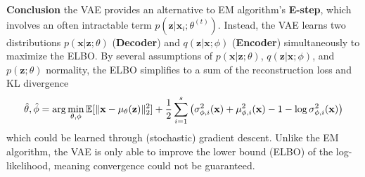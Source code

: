 \textbf{Conclusion} the VAE provides an alternative to EM algorithm's \textbf{E-step}, which involves an often intractable term $p(\mathbf{z}|\mathbf{x}_i;\theta^{(t)})$. Instead, the VAE learns two distributions $p(\mathbf{x}|\mathbf{z};\theta)$ (\textbf{Decoder}) and $q(\mathbf{z}|\mathbf{x};\phi)$ (\textbf{Encoder}) simultaneously to maximize the ELBO. By several assumptions of $p(\mathbf{x}|\mathbf{z};\theta)$, $q(\mathbf{z}|\mathbf{x};\phi)$, and $p(\mathbf{z};\theta)$ normality, the ELBO simplifies to a sum of the reconstruction loss and KL divergence
\[
    \hat{\theta},\hat{\phi} = \arg\min_{\theta,\phi} \mathbb{E}[\|\mathbf{x} - \mu_\theta(\mathbf{z})\|_2^2] + \frac{1}{2} \sum_{i=1}^s \left( \sigma_{\phi,i}^2(\mathbf{x}) + \mu_{\phi,i}^2(\mathbf{x}) - 1 - \log \sigma_{\phi,i}^2(\mathbf{x}) \right)
\]
which could be learned through (stochastic) gradient descent. Unlike the EM algorithm, the VAE is only able to improve the lower bound (ELBO) of the log-likelihood, meaning convergence could not be guaranteed.